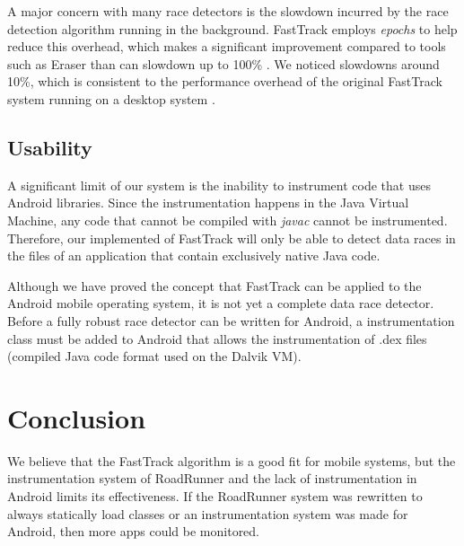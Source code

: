 \documentclass{acm_proc_article-sp}
\begin{document}
A major concern with many race detectors is the slowdown incurred by the race detection algorithm running in the background. FastTrack employs \emph{epochs} to help reduce this overhead, which makes a significant improvement compared to tools such as Eraser than can slowdown up to 100\% \cite{Savage1997}. We noticed slowdowns around 10\%, which is consistent to the performance overhead of the original FastTrack system running on a desktop system \cite{Flanagan2010}.

\subsection{Usability}
A significant limit of our system is the inability to instrument code that uses Android libraries. Since the instrumentation happens in the Java Virtual Machine, any code that cannot be compiled with \emph{javac} cannot be instrumented. Therefore, our implemented of FastTrack will only be able to detect data races in the files of an application that contain exclusively native Java code.

Although we have proved the concept that FastTrack can be applied to the Android mobile operating system, it is not yet a complete data race detector. Before a fully robust race detector can be written for Android, a instrumentation class must be added to Android that allows the instrumentation of .dex files (compiled Java code format used on the Dalvik VM).





\section{Conclusion}
We believe that the FastTrack algorithm is a good fit for mobile systems, but the instrumentation system of RoadRunner and the lack of instrumentation in Android limits its effectiveness. If the RoadRunner system was rewritten to always statically load classes or an instrumentation system was made for Android, then more apps could be monitored.



\end{document}
